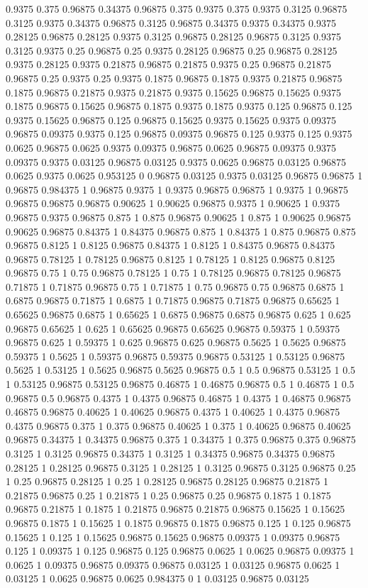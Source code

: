 0.9375 0.375
0.96875 0.34375
0.96875 0.375
0.9375 0.375
0.9375 0.3125
0.96875 0.3125
0.9375 0.34375
0.96875 0.3125
0.96875 0.34375
0.9375 0.34375
0.9375 0.28125
0.96875 0.28125
0.9375 0.3125
0.96875 0.28125
0.96875 0.3125
0.9375 0.3125
0.9375 0.25
0.96875 0.25
0.9375 0.28125
0.96875 0.25
0.96875 0.28125
0.9375 0.28125
0.9375 0.21875
0.96875 0.21875
0.9375 0.25
0.96875 0.21875
0.96875 0.25
0.9375 0.25
0.9375 0.1875
0.96875 0.1875
0.9375 0.21875
0.96875 0.1875
0.96875 0.21875
0.9375 0.21875
0.9375 0.15625
0.96875 0.15625
0.9375 0.1875
0.96875 0.15625
0.96875 0.1875
0.9375 0.1875
0.9375 0.125
0.96875 0.125
0.9375 0.15625
0.96875 0.125
0.96875 0.15625
0.9375 0.15625
0.9375 0.09375
0.96875 0.09375
0.9375 0.125
0.96875 0.09375
0.96875 0.125
0.9375 0.125
0.9375 0.0625
0.96875 0.0625
0.9375 0.09375
0.96875 0.0625
0.96875 0.09375
0.9375 0.09375
0.9375 0.03125
0.96875 0.03125
0.9375 0.0625
0.96875 0.03125
0.96875 0.0625
0.9375 0.0625
0.953125 0
0.96875 0.03125
0.9375 0.03125
0.96875 0.96875
1 0.96875
0.984375 1
0.96875 0.9375
1 0.9375
0.96875 0.96875
1 0.9375
1 0.96875
0.96875 0.96875
0.96875 0.90625
1 0.90625
0.96875 0.9375
1 0.90625
1 0.9375
0.96875 0.9375
0.96875 0.875
1 0.875
0.96875 0.90625
1 0.875
1 0.90625
0.96875 0.90625
0.96875 0.84375
1 0.84375
0.96875 0.875
1 0.84375
1 0.875
0.96875 0.875
0.96875 0.8125
1 0.8125
0.96875 0.84375
1 0.8125
1 0.84375
0.96875 0.84375
0.96875 0.78125
1 0.78125
0.96875 0.8125
1 0.78125
1 0.8125
0.96875 0.8125
0.96875 0.75
1 0.75
0.96875 0.78125
1 0.75
1 0.78125
0.96875 0.78125
0.96875 0.71875
1 0.71875
0.96875 0.75
1 0.71875
1 0.75
0.96875 0.75
0.96875 0.6875
1 0.6875
0.96875 0.71875
1 0.6875
1 0.71875
0.96875 0.71875
0.96875 0.65625
1 0.65625
0.96875 0.6875
1 0.65625
1 0.6875
0.96875 0.6875
0.96875 0.625
1 0.625
0.96875 0.65625
1 0.625
1 0.65625
0.96875 0.65625
0.96875 0.59375
1 0.59375
0.96875 0.625
1 0.59375
1 0.625
0.96875 0.625
0.96875 0.5625
1 0.5625
0.96875 0.59375
1 0.5625
1 0.59375
0.96875 0.59375
0.96875 0.53125
1 0.53125
0.96875 0.5625
1 0.53125
1 0.5625
0.96875 0.5625
0.96875 0.5
1 0.5
0.96875 0.53125
1 0.5
1 0.53125
0.96875 0.53125
0.96875 0.46875
1 0.46875
0.96875 0.5
1 0.46875
1 0.5
0.96875 0.5
0.96875 0.4375
1 0.4375
0.96875 0.46875
1 0.4375
1 0.46875
0.96875 0.46875
0.96875 0.40625
1 0.40625
0.96875 0.4375
1 0.40625
1 0.4375
0.96875 0.4375
0.96875 0.375
1 0.375
0.96875 0.40625
1 0.375
1 0.40625
0.96875 0.40625
0.96875 0.34375
1 0.34375
0.96875 0.375
1 0.34375
1 0.375
0.96875 0.375
0.96875 0.3125
1 0.3125
0.96875 0.34375
1 0.3125
1 0.34375
0.96875 0.34375
0.96875 0.28125
1 0.28125
0.96875 0.3125
1 0.28125
1 0.3125
0.96875 0.3125
0.96875 0.25
1 0.25
0.96875 0.28125
1 0.25
1 0.28125
0.96875 0.28125
0.96875 0.21875
1 0.21875
0.96875 0.25
1 0.21875
1 0.25
0.96875 0.25
0.96875 0.1875
1 0.1875
0.96875 0.21875
1 0.1875
1 0.21875
0.96875 0.21875
0.96875 0.15625
1 0.15625
0.96875 0.1875
1 0.15625
1 0.1875
0.96875 0.1875
0.96875 0.125
1 0.125
0.96875 0.15625
1 0.125
1 0.15625
0.96875 0.15625
0.96875 0.09375
1 0.09375
0.96875 0.125
1 0.09375
1 0.125
0.96875 0.125
0.96875 0.0625
1 0.0625
0.96875 0.09375
1 0.0625
1 0.09375
0.96875 0.09375
0.96875 0.03125
1 0.03125
0.96875 0.0625
1 0.03125
1 0.0625
0.96875 0.0625
0.984375 0
1 0.03125
0.96875 0.03125
